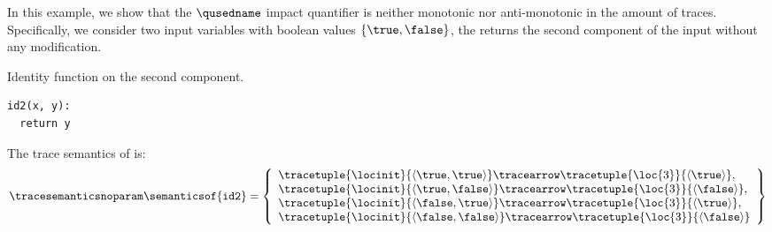 \begin{example}
In this example, we show that the $\qusedname$ impact quantifier is neither monotonic nor anti-monotonic in the amount of traces.
Specifically, we consider two input variables with boolean values $\{\true, \false\}$, the  returns the second component of the input without any modification.
\begin{marginlisting}[*-2]
  \caption{Identity function on the second component.}
  \vspace{25pt}
\begin{lstlisting}[style=mystyle,language=customPython]
id2(x, y):
  return y
 \end{lstlisting}
\end{marginlisting}
The trace semantics of  is:
\begin{align*}
  \tracesemanticsnoparam\semanticsof{\texttt{id2}}
  =
  \left\{
    \begin{array}{l}
      \tracetuple{\locinit}{\langle \true, \true\rangle}\tracearrow\tracetuple{\loc{3}}{\langle \true\rangle}, \\
      \tracetuple{\locinit}{\langle \true, \false\rangle}\tracearrow\tracetuple{\loc{3}}{\langle \false\rangle}, \\
      \tracetuple{\locinit}{\langle \false, \true\rangle}\tracearrow\tracetuple{\loc{3}}{\langle \true\rangle}, \\
      \tracetuple{\locinit}{\langle \false, \false\rangle}\tracearrow\tracetuple{\loc{3}}{\langle \false\rangle}
    \end{array}
    \right\}
\end{align*}
\begin{marginfigure}[*-4]
\end{marginfigure}
\end{example}

